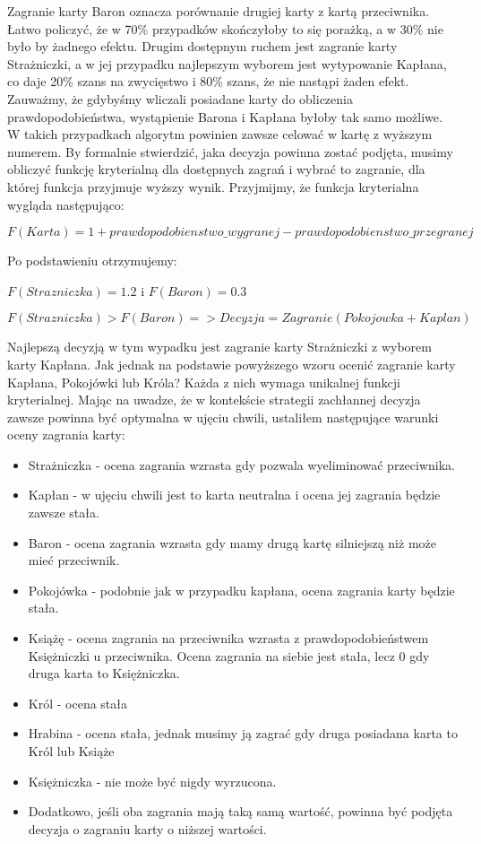 Zagranie karty Baron oznacza porównanie drugiej karty z kartą przeciwnika. Łatwo policzyć, że w 70\% przypadków skończyłoby to się porażką, a w 30\% nie było by żadnego efektu. Drugim dostępnym ruchem jest zagranie karty Strażniczki, a w jej przypadku najlepszym wyborem jest wytypowanie Kapłana, co daje 20\% szans na zwycięstwo i 80\% szans, że nie nastąpi żaden efekt. Zauważmy, że gdybyśmy wliczali posiadane karty do obliczenia prawdopodobieństwa, wystąpienie Barona i Kapłana byłoby tak samo możliwe. W takich przypadkach algorytm powinien zawsze celować w kartę z wyższym numerem. By formalnie stwierdzić, jaka decyzja powinna zostać podjęta, musimy obliczyć funkcję kryterialną dla dostępnych zagrań i wybrać to zagranie, dla której funkcja przyjmuje wyższy wynik. Przyjmijmy, że funkcja kryterialna wygląda następująco:

\begin{center}
	$F(Karta) = 1 + prawdopodobienstwo\_wygranej - prawdopodobienstwo\_przegranej$
\end{center}
Po podstawieniu otrzymujemy:
\begin{center}
 $F(Strazniczka)=1.2$ i $F(Baron) = 0.3$
 
 $F(Strazniczka)>F(Baron) => Decyzja=Zagranie(Pokojowka + Kaplan)$ 
\end{center} 

Najlepszą decyzją w tym wypadku jest zagranie karty Strażniczki z wyborem karty Kapłana. Jak jednak na podstawie powyższego wzoru ocenić zagranie karty Kapłana, Pokojówki lub Króla? Każda z nich wymaga unikalnej funkcji kryterialnej. Mając na uwadze, że w kontekście strategii zachłannej decyzja zawsze powinna być optymalna w ujęciu chwili, ustaliłem następujące warunki oceny zagrania karty:
\begin{itemize}
	\item Strażniczka - ocena zagrania wzrasta gdy pozwala wyeliminować przeciwnika.
	\item Kapłan - w ujęciu chwili jest to karta neutralna i ocena jej zagrania będzie zawsze stała.
	\item Baron - ocena zagrania wzrasta gdy mamy drugą kartę silniejszą niż może mieć przeciwnik.
	\item Pokojówka - podobnie jak w przypadku kapłana, ocena zagrania karty będzie stała.
	\item Książę - ocena zagrania na przeciwnika wzrasta z prawdopodobieństwem Księżniczki u przeciwnika. Ocena zagrania na siebie jest stała, lecz 0 gdy druga karta to Księżniczka.
	\item Król - ocena stała
	\item Hrabina - ocena stała, jednak musimy ją zagrać gdy druga posiadana karta to Król lub Książe
	\item Księżniczka - nie może być nigdy wyrzucona.
	\item Dodatkowo, jeśli oba zagrania mają taką samą wartość, powinna być podjęta decyzja o zagraniu karty o niższej wartości.
\end{itemize}

